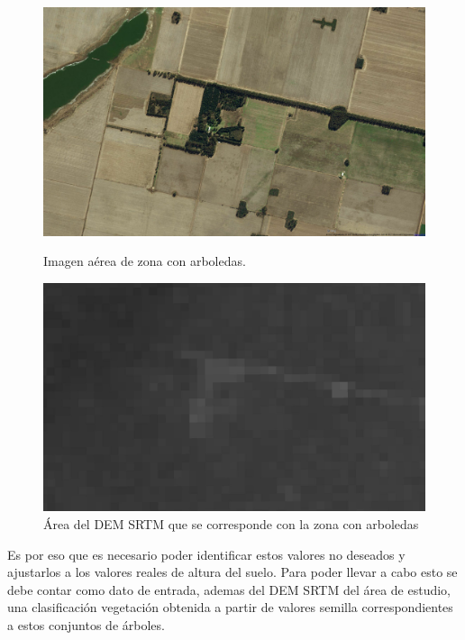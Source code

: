 \documentclass[10pt,a4paper, twoside]{report}
\begin{document}
\begin{figure}[!htb]
   \begin{minipage}{0.48\textwidth}
			\centering
			\includegraphics[width=1.0\linewidth]{imagenes/BingArboledas.jpg}
			\caption{Imagen aérea de zona con arboledas.}
			\label{BingArboledas}
   \end{minipage}\hfill
   \begin {minipage}{0.48\textwidth}
			\centering
			\includegraphics[width=1.0\linewidth]{imagenes/DEMConArboledas.jpg}
			\caption{Área del DEM SRTM que se corresponde con la zona con arboledas}
			\label{DEMConArboledas}
   \end{minipage}
\end{figure}


Es por eso que es necesario poder identificar estos valores no deseados y ajustarlos a los valores reales de altura del suelo. Para poder llevar a cabo esto se debe contar como dato de entrada, ademas del DEM SRTM del área de estudio, una clasificación vegetación obtenida a partir de valores semilla correspondientes a estos conjuntos de árboles.
\end{document}
